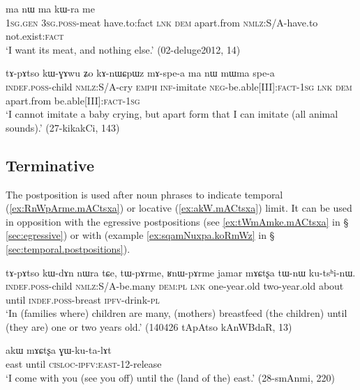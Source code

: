  \begin{exe}
 \ex \label{ex:ra.ma.nW.ma}
 \gll [aʑɯɣ ɯ-ɕa ra] ma nɯ ma kɯ-ra me \\
 \textsc{1sg}.\textsc{gen} \textsc{3sg}.\textsc{poss}-meat have.to:fact \textsc{lnk} \textsc{dem} apart.from \textsc{nmlz}:S/A-have.to not.exist:\textsc{fact} \\
 \glt `I want its meat, and nothing else.' (02-deluge2012, 14)
\end{exe}

 \begin{exe}
 \ex \label{ex:mAspea.ma.nW.ma}
 \gll tɤ-pɤtso kɯ-ɣɤwu ʑo kɤ-nɯɕpɯz mɤ-spe-a ma nɯ mɯma spe-a \\
 \textsc{indef}.\textsc{poss}-child \textsc{nmlz}:S/A-cry \textsc{emph} \textsc{inf}-imitate \textsc{neg}-be.able[III]:\textsc{fact}-\textsc{1sg} \textsc{lnk} \textsc{dem} apart.from be.able[III]:\textsc{fact}-\textsc{1sg}  \\
\glt  `I cannot imitate a baby crying, but apart form that I can imitate (all animal sounds).' (27-kikakCi, 143)
\end{exe}

\subsection{Terminative} \label{sec:terminative}  

The postposition  is used after noun phrases to indicate temporal (\ref{ex:RnWpArme.mACtsxa}) or locative (\ref{ex:akW.mACtsxa}) limit. It can be used in opposition with the egressive postpositions (see \ref{ex:tWmAmke.mACtsxa} in § \ref{sec:egressive}) or with  (example \ref{ex:sqamNuxpa.koRmWz} in § \ref{sec:temporal.postpositions}).

\begin{exe}
\ex \label{ex:RnWpArme.mACtsxa}
 \gll tɤ-pɤtso kɯ-dɤn nɯra tɕe, tɯ-pɤrme, ʁnɯ-pɤrme jamar mɤɕtʂa tɯ-nɯ ku-tsʰi-nɯ. \\
 \textsc{indef}.\textsc{poss}-child \textsc{nmlz}:S/A-be.many \textsc{dem}:\textsc{pl} \textsc{lnk} one-year.old two-year.old about until \textsc{indef}.\textsc{poss}-breast \textsc{ipfv}-drink-\textsc{pl} \\
 \glt `In (families where) children are many, (mothers) breastfeed (the children) until (they are) one or two years old.' (140426 tApAtso kAnWBdaR, 13)
\end{exe}

\begin{exe}
\ex \label{ex:akW.mACtsxa}
 \gll akɯ mɤɕtʂa ɣɯ-ku-ta-lɤt \\ 
east until \textsc{cisloc}-\textsc{ipfv}:\textsc{east}-1\fl{}2-release \\
\glt  `I come with you (see you off) until the (land of the) east.' (28-smAnmi, 220)
\end{exe}

